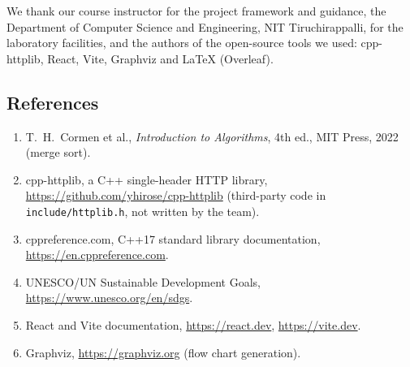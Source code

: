 \documentclass[11pt,a4paper]{article}
\begin{document}
We thank our course instructor for the project framework and guidance, the Department of Computer Science and Engineering, NIT Tiruchirappalli, for the laboratory facilities, and the authors of the open-source tools we used: cpp-httplib, React, Vite, Graphviz and \LaTeX{} (Overleaf).

\subsection{References}

\begin{enumerate}[nosep]
\item T.~H.~Cormen et al., \emph{Introduction to Algorithms}, 4th ed., MIT Press, 2022 (merge sort).
\item cpp-httplib, a C++ single-header HTTP library, \url{https://github.com/yhirose/cpp-httplib} (third-party code in \texttt{include/httplib.h}, not written by the team).
\item cppreference.com, C++17 standard library documentation, \url{https://en.cppreference.com}.
\item UNESCO/UN Sustainable Development Goals, \url{https://www.unesco.org/en/sdgs}.
\item React and Vite documentation, \url{https://react.dev}, \url{https://vite.dev}.
\item Graphviz, \url{https://graphviz.org} (flow chart generation).
\end{enumerate}
\end{document}
